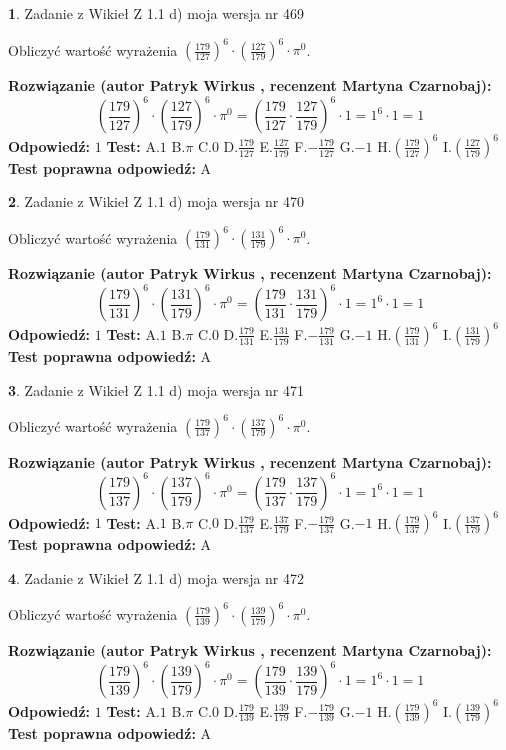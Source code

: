\documentclass[12pt, a4paper]{article}
\theoremstyle{definition} %
\newtheorem{zad}{}
\newcommand{\zadStart}[1]{\begin{zad}#1\newline}
\newcommand{\zadStop}{\end{zad}}
\newcommand{\rozwStart}[2]{\noindent \textbf{Rozwiązanie (autor #1 , recenzent #2): }\newline}
\newcommand{\rozwStop}{\newline}
\newcommand{\odpStart}{\noindent \textbf{Odpowiedź:}\newline}
\newcommand{\odpStop}{\newline}
\newcommand{\testStart}{\noindent \textbf{Test:}\newline}
\newcommand{\testStop}{\newline}
\newcommand{\kluczStart}{\noindent \textbf{Test poprawna odpowiedź:}\newline}
\newcommand{\kluczStop}{\newline}
\begin{document}
\zadStart{Zadanie z Wikieł Z 1.1 d) moja wersja nr 469}

Obliczyć wartość wyrażenia $(\frac{179}{127})^{6} \cdot (\frac{127}{179})^{6} \cdot \pi^{0}$.
\zadStop
\rozwStart{Patryk Wirkus}{Martyna Czarnobaj}
$$(\frac{179}{127})^{6} \cdot (\frac{127}{179})^{6} \cdot \pi^{0} = (\frac{179}{127} \cdot \frac{127}{179})^{6} \cdot 1 = 1^{6} \cdot 1 = 1$$
\rozwStop
\odpStart
$1$
\odpStop
\testStart
A.$1$ B.$\pi$ C.$0$ D.$\frac{179}{127}$ E.$\frac{127}{179}$
F.$-\frac{179}{127}$ G.$-1$
H.$(\frac{179}{127})^{6}$
I.$(\frac{127}{179})^{6}$
\testStop
\kluczStart
A
\kluczStop



\zadStart{Zadanie z Wikieł Z 1.1 d) moja wersja nr 470}

Obliczyć wartość wyrażenia $(\frac{179}{131})^{6} \cdot (\frac{131}{179})^{6} \cdot \pi^{0}$.
\zadStop
\rozwStart{Patryk Wirkus}{Martyna Czarnobaj}
$$(\frac{179}{131})^{6} \cdot (\frac{131}{179})^{6} \cdot \pi^{0} = (\frac{179}{131} \cdot \frac{131}{179})^{6} \cdot 1 = 1^{6} \cdot 1 = 1$$
\rozwStop
\odpStart
$1$
\odpStop
\testStart
A.$1$ B.$\pi$ C.$0$ D.$\frac{179}{131}$ E.$\frac{131}{179}$
F.$-\frac{179}{131}$ G.$-1$
H.$(\frac{179}{131})^{6}$
I.$(\frac{131}{179})^{6}$
\testStop
\kluczStart
A
\kluczStop



\zadStart{Zadanie z Wikieł Z 1.1 d) moja wersja nr 471}

Obliczyć wartość wyrażenia $(\frac{179}{137})^{6} \cdot (\frac{137}{179})^{6} \cdot \pi^{0}$.
\zadStop
\rozwStart{Patryk Wirkus}{Martyna Czarnobaj}
$$(\frac{179}{137})^{6} \cdot (\frac{137}{179})^{6} \cdot \pi^{0} = (\frac{179}{137} \cdot \frac{137}{179})^{6} \cdot 1 = 1^{6} \cdot 1 = 1$$
\rozwStop
\odpStart
$1$
\odpStop
\testStart
A.$1$ B.$\pi$ C.$0$ D.$\frac{179}{137}$ E.$\frac{137}{179}$
F.$-\frac{179}{137}$ G.$-1$
H.$(\frac{179}{137})^{6}$
I.$(\frac{137}{179})^{6}$
\testStop
\kluczStart
A
\kluczStop



\zadStart{Zadanie z Wikieł Z 1.1 d) moja wersja nr 472}

Obliczyć wartość wyrażenia $(\frac{179}{139})^{6} \cdot (\frac{139}{179})^{6} \cdot \pi^{0}$.
\zadStop
\rozwStart{Patryk Wirkus}{Martyna Czarnobaj}
$$(\frac{179}{139})^{6} \cdot (\frac{139}{179})^{6} \cdot \pi^{0} = (\frac{179}{139} \cdot \frac{139}{179})^{6} \cdot 1 = 1^{6} \cdot 1 = 1$$
\rozwStop
\odpStart
$1$
\odpStop
\testStart
A.$1$ B.$\pi$ C.$0$ D.$\frac{179}{139}$ E.$\frac{139}{179}$
F.$-\frac{179}{139}$ G.$-1$
H.$(\frac{179}{139})^{6}$
I.$(\frac{139}{179})^{6}$
\testStop
\kluczStart
A
\kluczStop
\end{document}
